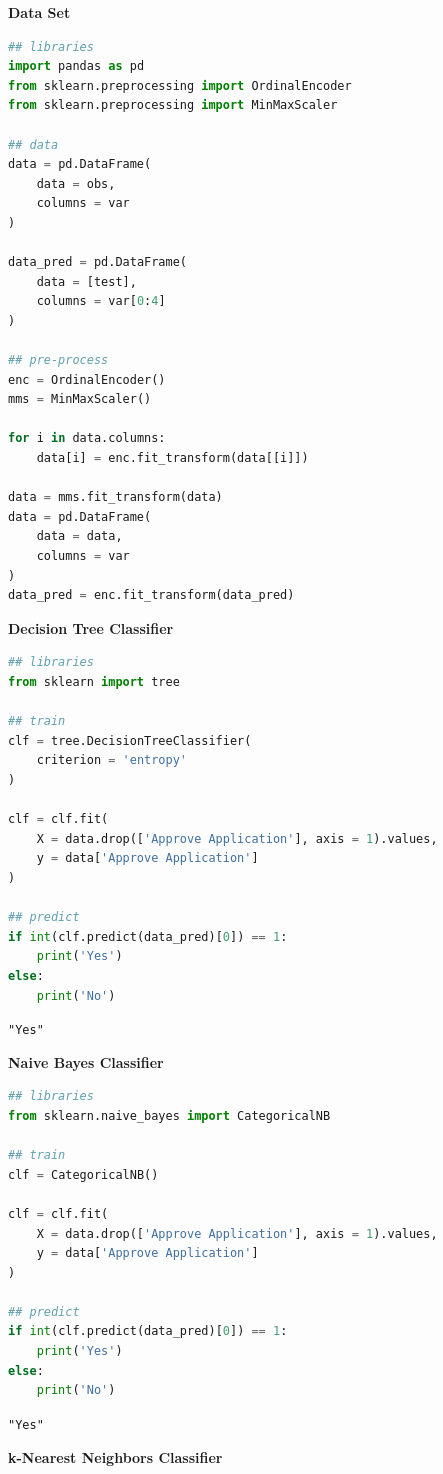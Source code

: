 \documentclass{article}
\begin{document}
\item \textbf{Data Set}
\begin{lstlisting}[language=Python, title=Python 3: Pandas Dataframe]
## libraries
import pandas as pd
from sklearn.preprocessing import OrdinalEncoder
from sklearn.preprocessing import MinMaxScaler

## data
data = pd.DataFrame(
    data = obs,
    columns = var
)

data_pred = pd.DataFrame(
    data = [test],
    columns = var[0:4]
)

## pre-process
enc = OrdinalEncoder()
mms = MinMaxScaler()

for i in data.columns:
    data[i] = enc.fit_transform(data[[i]])

data = mms.fit_transform(data)
data = pd.DataFrame(
    data = data,
    columns = var
)
data_pred = enc.fit_transform(data_pred)\end{lstlisting}

\item \textbf{Decision Tree Classifier}
\begin{lstlisting}[language=Python, title=Python 3: Scikit-Learn Decision Tree Classifier]
## libraries
from sklearn import tree

## train
clf = tree.DecisionTreeClassifier(
    criterion = 'entropy'
)

clf = clf.fit(
    X = data.drop(['Approve Application'], axis = 1).values,
    y = data['Approve Application']
)

## predict
if int(clf.predict(data_pred)[0]) == 1:
    print('Yes')
else:
    print('No')\end{lstlisting}
\verb|"Yes"|\\


\item \textbf{Naive Bayes Classifier}
\begin{lstlisting}[language=Python, title=Python 3: Scikit-Learn Naive Bayes Classifier]
## libraries
from sklearn.naive_bayes import CategoricalNB

## train
clf = CategoricalNB()

clf = clf.fit(
    X = data.drop(['Approve Application'], axis = 1).values,
    y = data['Approve Application']
)

## predict
if int(clf.predict(data_pred)[0]) == 1:
    print('Yes')
else:
    print('No')\end{lstlisting}
\verb|"Yes"|\\

\item \textbf{k-Nearest Neighbors Classifier}\\
\end{document}

